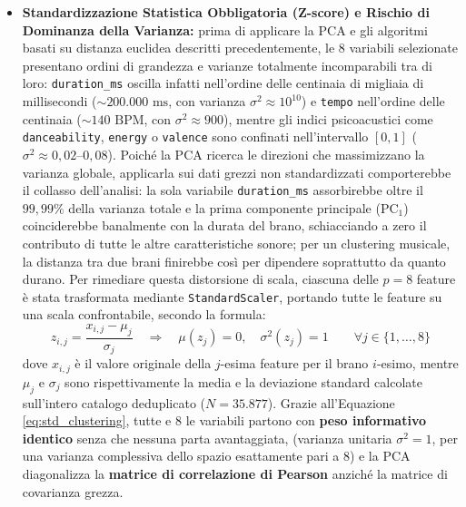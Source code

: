 \begin{itemize}
\begin{enumerate}
        \item La variabile \texttt{liveness}, poiché misura la probabilità che la traccia sia stata registrata dal vivo in presenza di pubblico; non rappresenta quindi una proprietà musicale o emotiva intrinseca del brano.
    \end{enumerate}
    Il sottoinsieme finale per il clustering comprende pertanto le \textbf{8 feature acustiche continue fondamentali}: \texttt{danceability}, \texttt{energy}, \texttt{speechiness}, \texttt{acousticness}, \texttt{instrumentalness}, \texttt{valence}, \texttt{tempo} e \texttt{duration\_ms}.
    \item \textbf{Standardizzazione Statistica Obbligatoria (Z-score) e Rischio di Dominanza della Varianza:} prima di applicare la PCA e gli algoritmi basati su distanza euclidea descritti precedentemente, le 8 variabili selezionate presentano ordini di grandezza e varianze totalmente incomparabili tra di loro: \texttt{duration\_ms} oscilla infatti nell'ordine delle centinaia di migliaia di millisecondi ($\sim 200.000\text{ ms}$, con varianza $\sigma^2 \approx 10^{10}$) e \texttt{tempo} nell'ordine delle centinaia ($\sim 140\text{ BPM}$, con $\sigma^2 \approx 900$), mentre gli indici psicoacustici come \texttt{danceability}, \texttt{energy} o \texttt{valence} sono confinati nell'intervallo $[0, 1]$ ($\sigma^2 \approx 0,02\text{--}0,08$). Poiché la PCA ricerca le direzioni che massimizzano la varianza globale, applicarla sui dati grezzi non standardizzati comporterebbe il collasso dell'analisi: la sola variabile \texttt{duration\_ms} assorbirebbe oltre il $99,99\%$ della varianza totale e la prima componente principale ($\text{PC}_1$) coinciderebbe banalmente con la durata del brano, schiacciando a zero il contributo di tutte le altre caratteristiche sonore; per un clustering musicale, la distanza tra due brani finirebbe così per dipendere soprattutto da quanto durano. Per rimediare questa distorsione di scala, ciascuna delle $p=8$ feature è stata trasformata mediante \texttt{StandardScaler}, portando tutte le feature su una scala confrontabile, secondo la formula:
    \begin{equation}
    \boxed{z_{i,j} = \frac{x_{i,j} - \mu_j}{\sigma_j} \quad \Longrightarrow \quad \mu(z_j) = 0, \quad \sigma^2(z_j) = 1 \qquad \forall j \in \{1, \dots, 8\}}
    \label{eq:std_clustering}
    \end{equation}
    dove $x_{i,j}$ è il valore originale della $j$-esima feature per il brano $i$-esimo, mentre $\mu_j$ e $\sigma_j$ sono rispettivamente la media e la deviazione standard calcolate sull'intero catalogo deduplicato ($N = 35.877$). Grazie all'Equazione \ref{eq:std_clustering}, tutte e 8 le variabili partono con \textbf{peso informativo identico} senza che nessuna parta avantaggiata, (varianza unitaria $\sigma^2 = 1$, per una varianza complessiva dello spazio esattamente pari a $8$) e la PCA diagonalizza la \textbf{matrice di correlazione di Pearson} anziché la matrice di covarianza grezza.
\end{itemize}

